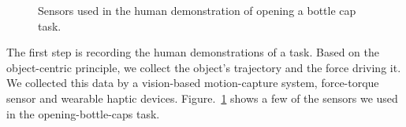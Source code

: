 \begin{figure}
  \centering
    \caption{\scriptsize{Sensors used in the human demonstration of
        opening a bottle cap task.}
      }
  \label{fig:devices}
\end{figure}

The first step is recording the human demonstrations of a task. Based on the object-centric principle, we collect the object's trajectory and the force driving it. %
We collected this data by a vision-based motion-capture system,
force-torque sensor and wearable haptic
devices. Figure.~\ref{fig:devices} shows a few of the sensors we used
in the opening-bottle-caps task. %


